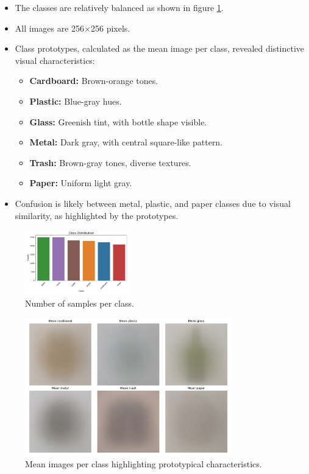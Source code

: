 \documentclass[12pt]{article}
\begin{document}
\begin{itemize}
    \item The classes are relatively balanced as shown in figure \ref{fig:class_distribution}.
    \item All images are 256$\times$256 pixels.
    \item Class prototypes, calculated as the mean image per class, revealed distinctive visual characteristics:
    \begin{itemize}
        \item \textbf{Cardboard:} Brown-orange tones.
        \item \textbf{Plastic:} Blue-gray hues.
        \item \textbf{Glass:} Greenish tint, with bottle shape visible.
        \item \textbf{Metal:} Dark gray, with central square-like pattern.
        \item \textbf{Trash:} Brown-gray tones, diverse textures.
        \item \textbf{Paper:} Uniform light gray.
    \end{itemize}
    \item Confusion is likely between metal, plastic, and paper classes due to visual similarity, as highlighted by the prototypes.
\end{itemize}

\begin{figure}[h!]
    \centering
    \includegraphics[width=0.4\textwidth]{figures/EDA/class_distribution.pdf}
    \caption{Number of samples per class.}
    \label{fig:class_distribution}
\end{figure}

\newpage
\begin{figure}[h!]
    \centering
    \includegraphics[width=0.8\textwidth]{figures/EDA/class_prototypes_mean.pdf}
    \caption{Mean images per class highlighting prototypical characteristics.}
    \label{fig:mean_images}
\end{figure}
\end{document}
